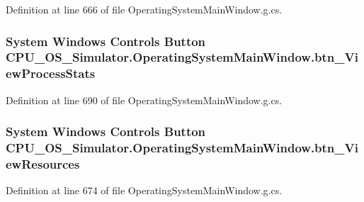 Definition at line 666 of file Operating\+System\+Main\+Window.\+g.\+cs.

\hypertarget{class_c_p_u___o_s___simulator_1_1_operating_system_main_window_a3a79b95c6d74117cf22ebe46072ab5f7}{}
\subsubsection[{btn\+\_\+\+View\+Process\+Stats}]{\setlength{\rightskip}{0pt plus 5cm}System Windows Controls Button C\+P\+U\+\_\+\+O\+S\+\_\+\+Simulator.\+Operating\+System\+Main\+Window.\+btn\+\_\+\+View\+Process\+Stats\hspace{0.3cm}{\ttfamily [package]}}\label{class_c_p_u___o_s___simulator_1_1_operating_system_main_window_a3a79b95c6d74117cf22ebe46072ab5f7}


Definition at line 690 of file Operating\+System\+Main\+Window.\+g.\+cs.

\hypertarget{class_c_p_u___o_s___simulator_1_1_operating_system_main_window_a976a78ddaa5bc715f884140f1680b5f3}{}
\subsubsection[{btn\+\_\+\+View\+Resources}]{\setlength{\rightskip}{0pt plus 5cm}System Windows Controls Button C\+P\+U\+\_\+\+O\+S\+\_\+\+Simulator.\+Operating\+System\+Main\+Window.\+btn\+\_\+\+View\+Resources\hspace{0.3cm}{\ttfamily [package]}}\label{class_c_p_u___o_s___simulator_1_1_operating_system_main_window_a976a78ddaa5bc715f884140f1680b5f3}


Definition at line 674 of file Operating\+System\+Main\+Window.\+g.\+cs.

